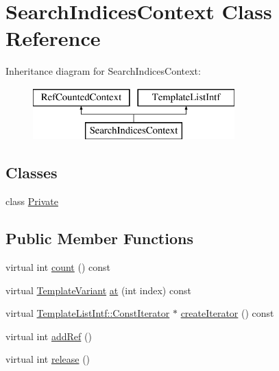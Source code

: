 \hypertarget{class_search_indices_context}{}\section{Search\+Indices\+Context Class Reference}
\label{class_search_indices_context}
Inheritance diagram for Search\+Indices\+Context\+:\begin{figure}[H]
\begin{center}
\leavevmode
\includegraphics[height=2.000000cm]{class_search_indices_context}
\end{center}
\end{figure}
\subsection*{Classes}
\begin{DoxyCompactItemize}
\item 
class \mbox{\hyperlink{class_search_indices_context_1_1_private}{Private}}
\end{DoxyCompactItemize}
\subsection*{Public Member Functions}
\begin{DoxyCompactItemize}
\item 
virtual int \mbox{\hyperlink{class_search_indices_context_aa8606de3f00d255756169fbf11b134e8}{count}} () const
\item 
virtual \mbox{\hyperlink{class_template_variant}{Template\+Variant}} \mbox{\hyperlink{class_search_indices_context_a01954b6da883d9274840295905a999c8}{at}} (int index) const
\item 
virtual \mbox{\hyperlink{class_template_list_intf_1_1_const_iterator}{Template\+List\+Intf\+::\+Const\+Iterator}} $\ast$ \mbox{\hyperlink{class_search_indices_context_a0247f88bc151ed4620c36386bdae999f}{create\+Iterator}} () const
\item 
virtual int \mbox{\hyperlink{class_search_indices_context_ac6351cde31163d5a7e94bd43ea795673}{add\+Ref}} ()
\item 
virtual int \mbox{\hyperlink{class_search_indices_context_aaa6a25a82368e6d94c4c552687f2af7b}{release}} ()
\end{DoxyCompactItemize}
